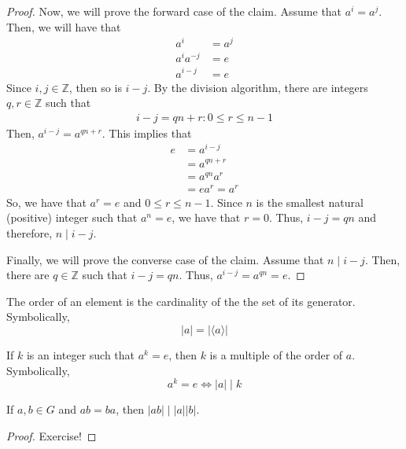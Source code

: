 \begin{proof}
    Now, we will prove the forward case of the claim. Assume that \(a^i = a^j\). Then, we will have that
    \[
    \begin{aligned}
        a^{i} &= a^{j} \\
        a^i a^{-j} &= e \\
        a^{i-j} &= e
    \end{aligned}
    \]
    Since \(i, j \in \mathbb{Z}\), then so is \(i-j\). By the division algorithm, there are integers \(q, r \in \mathbb{Z}\) such that
    \[
    \begin{aligned}
        i-j = qn + r : 0 \leq r \leq n-1
    \end{aligned}
    \]
    Then, \(a^{i-j} = a^{qn + r}\). This implies that
    \[
    \begin{aligned}
        e &= a^{i-j} \\
          &= a^{qn+r} \\
          &= a^{qn} a^r \\
          &= ea^r = a^r
    \end{aligned}
    \]
    So, we have that \(a^r = e\) and \(0 \leq r \leq n-1\). Since \(n\) is the smallest natural (positive) integer such that \(a^n = e\), we have that \(r = 0\). Thus, \(i-j = qn\) and therefore, \(n \mid i-j\).

    Finally, we will prove the converse case of the claim. Assume that \(n \mid i-j\). Then, there are \(q \in \mathbb{Z}\) such that \(i-j = qn\). Thus, \(a^{i-j} = a^{qn} = e\).
\end{proof}

\begin{corollary}
    The order of an element is the cardinality of the the set of its generator. Symbolically,
    \[
        |a| = |\langle a \rangle|
    \]
\end{corollary}

\begin{corollary}
    If \(k\) is an integer such that \(a^k = e\), then \(k\) is a multiple of the order of \(a\). Symbolically,
    \[
        a^k = e \iff |a| \mid k
    \]
\end{corollary}

\begin{corollary}
    If \(a, b \in G\) and \(ab = ba\), then \(|ab| \mid |a||b|\).
\end{corollary}

\begin{proof}
    Exercise!
\end{proof}

